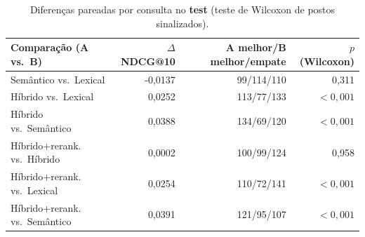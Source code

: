 \begin{table}[t]
\centering
\caption{Diferenças pareadas por consulta no \textbf{test} (teste de Wilcoxon de postos sinalizados).}
\label{tab:sig}
\small
\begin{tabular}{lrrr}
\toprule
Comparação (A vs.\ B) & $\Delta$ NDCG@10 & A melhor/B melhor/empate & $p$ (Wilcoxon) \\
\midrule
Semântico vs.\ Lexical & -0,0137 & 99/114/110 & 0,311 \\
Híbrido vs.\ Lexical & 0,0252 & 113/77/133 & $<0{,}001$ \\
Híbrido vs.\ Semântico & 0,0388 & 134/69/120 & $<0{,}001$ \\
Híbrido+rerank. vs.\ Híbrido & 0,0002 & 100/99/124 & 0,958 \\
Híbrido+rerank. vs.\ Lexical & 0,0254 & 110/72/141 & $<0{,}001$ \\
Híbrido+rerank. vs.\ Semântico & 0,0391 & 121/95/107 & $<0{,}001$ \\
\bottomrule
\end{tabular}
\end{table}
